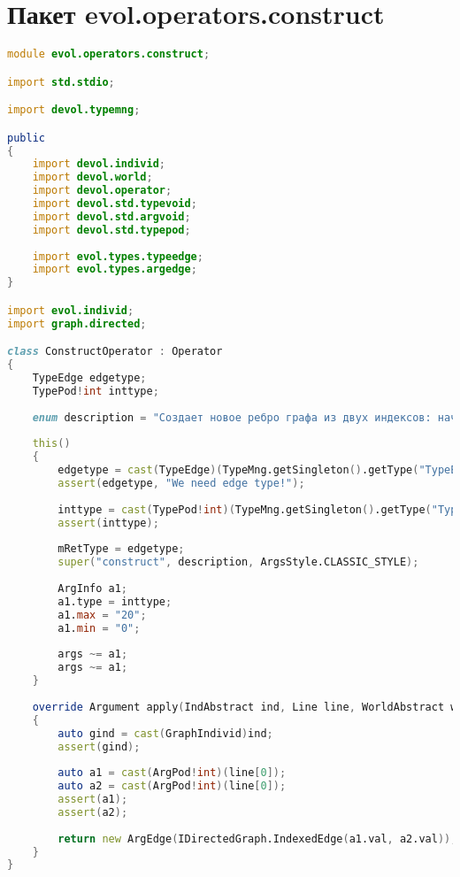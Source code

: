 \documentclass[russian,utf8,emptystyle]{eskdtext}
\begin{document}
\section{Пакет evol.operators.construct}
\begin{lstlisting}[language=D]
module evol.operators.construct;

import std.stdio;

import devol.typemng;

public
{
    import devol.individ;
    import devol.world;
    import devol.operator;
    import devol.std.typevoid;
    import devol.std.argvoid;
    import devol.std.typepod;
    
    import evol.types.typeedge;
    import evol.types.argedge;
}

import evol.individ;
import graph.directed;

class ConstructOperator : Operator
{
    TypeEdge edgetype;
    TypePod!int inttype;
    
    enum description = "Создает новое ребро графа из двух индексов: начала и конца.";
    
    this()
    {
        edgetype = cast(TypeEdge)(TypeMng.getSingleton().getType("TypeEdge"));
        assert(edgetype, "We need edge type!");
    
        inttype = cast(TypePod!int)(TypeMng.getSingleton().getType("Typeint"));
        assert(inttype);
        
        mRetType = edgetype;
        super("construct", description, ArgsStyle.CLASSIC_STYLE);
        
        ArgInfo a1;
        a1.type = inttype;
        a1.max = "20";
        a1.min = "0";
        
        args ~= a1;
        args ~= a1;
    }
    
    override Argument apply(IndAbstract ind, Line line, WorldAbstract world)
    {
        auto gind = cast(GraphIndivid)ind;
        assert(gind);
        
        auto a1 = cast(ArgPod!int)(line[0]);
        auto a2 = cast(ArgPod!int)(line[0]);
        assert(a1);
        assert(a2);
        
        return new ArgEdge(IDirectedGraph.IndexedEdge(a1.val, a2.val));
    }   
}
\end{lstlisting}
\end{document}
